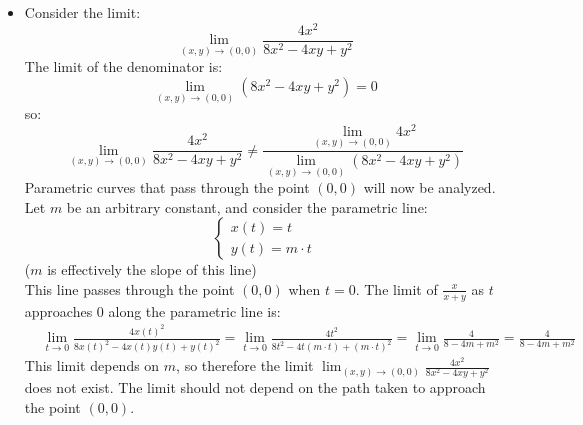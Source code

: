 \documentclass{article}
\begin{document}
\begin{itemize}
\[\begin{array}{c}
y(t) = m \cdot t
\end{array}\right.\]
(\(m\) is effectively the slope of this line) \\
This line passes through the point \((0, 0)\) when \(t = 0\). The limit of \(\frac{x}{x + y}\) as \(t\) approaches \(0\) along the parametric line is: 
\begin{align*}
& \lim_{t \rightarrow 0} \frac{x(t)}{x(t) + y(t)} 
= \lim_{t \rightarrow 0} \frac{t}{t + m \cdot t} 
= \lim_{t \rightarrow 0} \frac{1}{1 + m}  
= \frac{1}{1 + m}
\end{align*}
This limit depends on \(m\), so therefore the limit \(\lim_{(x, y) \rightarrow (0, 0)} \frac{x}{x + y}\) does not exist. The limit should not depend on the path taken to approach the point \((0, 0)\).
\item Consider the limit: 
\[\lim_{(x, y) \rightarrow (0, 0)} \frac{4x^2}{8x^2 - 4xy + y^2}\] 
The limit of the denominator is:
\[\lim_{(x, y) \rightarrow (0, 0)} (8x^2 - 4xy + y^2) = 0\] so:  
\[\lim_{(x, y) \rightarrow (0, 0)} \frac{4x^2}{8x^2 - 4xy + y^2} \neq \frac{\lim_{(x, y) \rightarrow (0, 0)} 4x^2}{\lim_{(x, y) \rightarrow (0, 0)} (8x^2 - 4xy + y^2)}\] 
Parametric curves that pass through the point \((0, 0)\) will now be analyzed. Let \(m\) be an arbitrary constant, and consider the parametric line:
\[\left\{\begin{array}{c}
x(t) = t \\ 
y(t) = m \cdot t
\end{array}\right.\]
(\(m\) is effectively the slope of this line) \\
This line passes through the point \((0, 0)\) when \(t = 0\). The limit of \(\frac{x}{x + y}\) as \(t\) approaches \(0\) along the parametric line is: 
\begin{align*}
& \lim_{t \rightarrow 0} \frac{4x(t)^2}{8x(t)^2 - 4x(t)y(t) + y(t)^2} 
= \lim_{t \rightarrow 0} \frac{4t^2}{8t^2 - 4t(m \cdot t) + (m \cdot t)^2} 
= \lim_{t \rightarrow 0} \frac{4}{8 - 4m + m^2}  
= \frac{4}{8 - 4m + m^2} 
\end{align*}
This limit depends on \(m\), so therefore the limit \(\lim_{(x, y) \rightarrow (0, 0)} \frac{4x^2}{8x^2 - 4xy + y^2}\) does not exist. The limit should not depend on the path taken to approach the point \((0, 0)\).  

\end{itemize}
\end{document}
